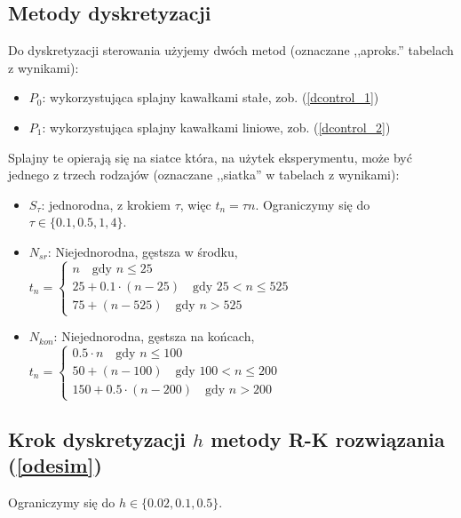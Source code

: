 \documentclass[licencjacka]{pracamgr}
\begin{document}
\subsection{Metody dyskretyzacji}
Do dyskretyzacji sterowania użyjemy dwóch metod (oznaczane ,,aproks.'' tabelach z wynikami):
\begin{itemize}
\item{$P_0$:} wykorzystująca splajny kawałkami stałe, zob. (\ref{dcontrol_1})
\item{$P_1$:} wykorzystująca splajny kawałkami liniowe, zob. (\ref{dcontrol_2})
\end{itemize}
Splajny te opierają się na siatce która, na użytek eksperymentu, może być jednego z trzech rodzajów (oznaczane ,,siatka'' w tabelach z wynikami):
\begin{itemize}
\item{$S_{\tau}$:} jednorodna, z krokiem $\tau$, więc $t_n = \tau n$. Ograniczymy się do $\tau \in \{0.1, 0.5, 1, 4\}$.
\item{$N_{sr}$: Niejednorodna, gęstsza w środku,} $t_n = \begin{cases}
    n \quad \text{gdy } n \le 25 \\
    25 + 0.1\cdot(n-25) \quad \text{gdy } 25 < n \le 525 \\
    75 + (n - 525) \quad \text{gdy } n > 525
  \end{cases}$
\item{$N_{kon}$: Niejednorodna, gęstsza na końcach,} $t_n = \begin{cases}
    0.5\cdot n \quad \text{gdy } n \le 100 \\
    50 + (n - 100) \quad \text{gdy } 100 < n \le 200 \\
    150 + 0.5\cdot (n - 200) \quad \text{gdy } n > 200
  \end{cases}$
\end{itemize}
\subsection{Krok dyskretyzacji $h$ metody R-K rozwiązania (\ref{odesim})}
Ograniczymy się do $h \in \{0.02, 0.1, 0.5\}$.
\end{document}

